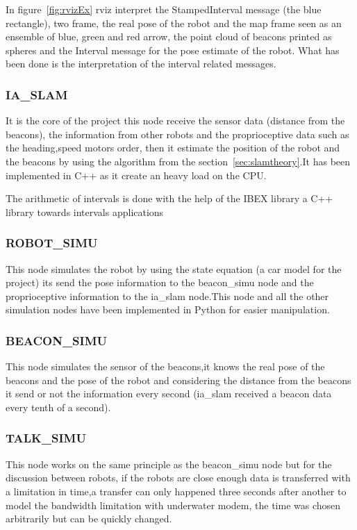 In figure~\ref{fig:rvizEx} rviz interpret the StampedInterval message (the blue rectangle), two frame, the real pose of the robot and the map frame seen as an ensemble of blue, green and red arrow, the point cloud of beacons printed as spheres and the Interval message for the pose estimate of the robot.
What has been done is the interpretation of the interval related messages.

\subsubsection*{IA\_SLAM}

It is the core of the project this node receive the sensor data (distance from the beacons), the information from other robots and the proprioceptive data such as the heading,speed motors order, then it estimate the position of the robot and the beacons by using the algorithm from the section~\ref{sec:slamtheory}.It has been implemented in C++ as it create an heavy load on the CPU.

The arithmetic of intervals is done with the help of the IBEX library a C++ library towards intervals applications~\cite{ibex}
\subsubsection*{ROBOT\_SIMU}

This node simulates the robot by using the state equation (a car model for the project) its send the pose information to the beacon\_simu node and the proprioceptive information to the ia\_slam node.This node and all the other simulation nodes have been implemented in Python for easier manipulation.

\subsubsection*{BEACON\_SIMU}

This node simulates the sensor of the beacons,it knows the real pose of the beacons and the pose of the robot and considering the distance from the beacons it send or not the information every second (ia\_slam received a beacon data every tenth of a second).

\subsubsection*{TALK\_SIMU}

This node works on the same principle as the beacon\_simu node but for the discussion between robots, if the robots are close enough data is transferred with a limitation in time,a transfer can only happened three seconds after another to model the bandwidth limitation with underwater modem, the time was chosen arbitrarily but can be quickly changed.

